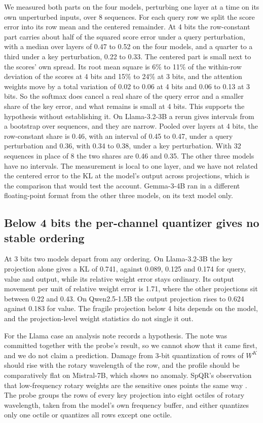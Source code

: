 \documentclass[journal]{IEEEtran}
\begin{document}
We measured both parts on the four models, perturbing one layer at a time on its own unperturbed
inputs, over 8 sequences. For each query row we split the score error into its row mean and the
centered remainder. At 4 bits the row-constant part carries about half of the squared score
error under a query perturbation, with a median over layers of 0.47 to 0.52 on the four models,
and a quarter to a third under a key perturbation, 0.22 to 0.33. The centered part is small next
to the scores' own spread. Its root mean square is 6\% to 11\% of the within-row deviation of the
scores at 4 bits and 15\% to 24\% at 3 bits, and the attention weights move by a total variation
of 0.02 to 0.06 at 4 bits and 0.06 to 0.13 at 3 bits. So the softmax does cancel a real share of
the query error and a smaller share of the key error, and what remains is small at 4 bits. This
supports the hypothesis without establishing it. On Llama-3.2-3B a rerun
gives intervals from a bootstrap over sequences, and they are narrow. Pooled over layers at 4
bits, the row-constant share is 0.46, with an interval of 0.45 to 0.47, under a query
perturbation and 0.36, with 0.34 to 0.38, under a key perturbation. With 32 sequences in place
of 8 the two shares are 0.46 and 0.35. The other three models have no intervals. The measurement
is local to one layer, and we have not related the centered error to the KL at the model's output across
projections, which is the comparison that would test the account. Gemma-3-4B ran in a different
floating-point format from the other three models, on its text model only.

\subsection{Below 4 bits the per-channel quantizer gives no stable ordering}\label{sec:proj:below4}

At 3 bits two models depart from any ordering. On Llama-3.2-3B the key projection alone gives a
KL of 0.741, against 0.089, 0.125 and 0.174 for query, value and output, while its relative
weight error stays ordinary. Its output movement per unit of relative weight error is 1.71, where
the other projections sit between 0.22 and 0.43. On Qwen2.5-1.5B the output projection rises to
0.624 against 0.183 for value. The fragile projection below 4 bits depends on the model, and the
projection-level weight statistics do not single it out.

For the Llama case an analysis note records a hypothesis. The note was committed together
with the probe's result, so we cannot show that it came first, and we do not claim a
prediction. Damage
from 3-bit quantization of rows of $W^K$ should rise with the rotary wavelength of the row, and
the profile should be comparatively flat on Mistral-7B, which shows no anomaly. SpQR's
observation that low-frequency rotary weights are the sensitive ones points the same way
\citep{dettmers2024spqr}. The probe groups the rows of every key projection into eight octiles
of rotary wavelength, taken from the model's own frequency buffer, and either quantizes only one
octile or quantizes all rows except one octile.
\end{document}
